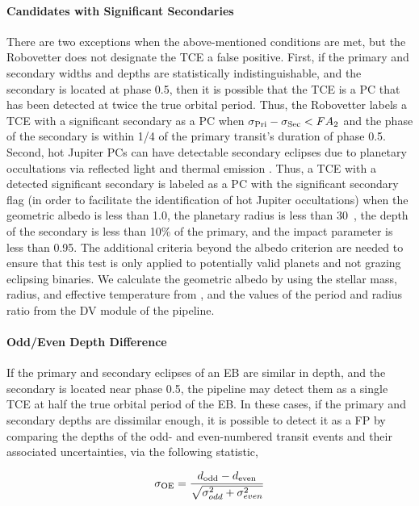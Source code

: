 \paragraph{Candidates with Significant Secondaries}
\label{s:sscand}
There are two exceptions when the above-mentioned conditions are met, but the Robovetter does not designate the TCE a false positive. First, if the primary and secondary widths and depths are statistically indistinguishable, and the secondary is located at phase 0.5, then it is possible that the TCE is a PC that has been detected at twice the true orbital period. Thus, the Robovetter labels a TCE with a significant secondary as a PC when ${\sigma_{\rm Pri} - \sigma_{\rm Sec} < FA_{2}}$ and the phase of the secondary is within 1/4 of the primary transit's duration of phase 0.5. Second, hot Jupiter PCs can have detectable secondary eclipses due to planetary occultations via reflected light and thermal emission \citep{Coughlin2012}. Thus, a TCE with a detected significant secondary is labeled as a PC with the significant secondary flag (in order to facilitate the identification of hot Jupiter occultations) when the geometric albedo is less than 1.0, the planetary radius is less than 30~\re{}, the depth of the secondary is less than 10\% of the primary, and the impact parameter is less than 0.95. The additional criteria beyond the albedo criterion are needed to ensure that this test is only applied to potentially valid planets and not grazing eclipsing binaries. We calculate the geometric albedo by using the stellar mass, radius, and effective temperature from \citet{Huber2014a}, and the values of the period and radius ratio from the DV module of the \kepler{} pipeline.



\paragraph{Odd/Even Depth Difference}

\label{s:oddeven}
If the primary and secondary eclipses of an EB are similar in depth, and the secondary is located near phase 0.5, the \kepler{} pipeline may detect them as a single TCE at half the true orbital period of the EB. In these cases, if the primary and secondary depths are dissimilar enough, it is possible to detect it as a FP by comparing the depths of the odd- and even-numbered transit events and their associated uncertainties, via the following statistic,

\begin{equation}
\sigma_{\rm OE} = \frac{d_{\rm odd} - d_{\rm even}}{\sqrt{\sigma_{odd}^{2} + \sigma_{even}^{2}}} 
\end{equation}

